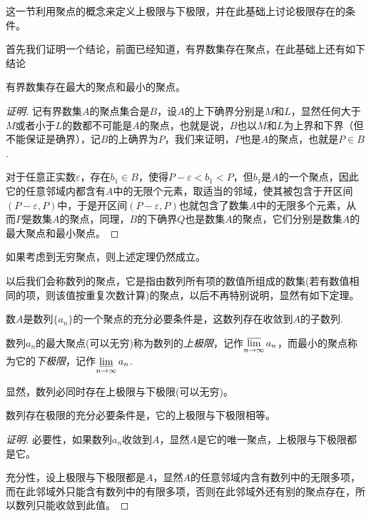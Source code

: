 这一节利用聚点的概念来定义上极限与下极限，并在此基础上讨论极限存在的条件。

首先我们证明一个结论，前面已经知道，有界数集存在聚点，在此基础上还有如下结论
\begin{theorem}
  有界数集存在最大的聚点和最小的聚点。
\end{theorem}

\begin{proof}[证明]
  记有界数集$A$的聚点集合是$B$，设$A$的上下确界分别是$M$和$L$，显然任何大于$M$或者小于$L$的数都不可能是$A$的聚点，也就是说，$B$也以$M$和$L$为上界和下界（但不能保证是确界），记$B$的上确界为$P$，我们来证明，$P$也是$A$的聚点，也就是$P \in B$.

  对于任意正实数$\varepsilon$，存在$b_1 \in B$，使得$P-\varepsilon < b_1 < P$，但$b_1$是$A$的一个聚点，因此它的任意邻域内都含有$A$中的无限个元素，取适当的邻域，使其被包含于开区间$(P-\varepsilon,P)$中，于是开区间$(P-\varepsilon,P)$也就包含了数集$A$中的无限多个元素，从而$P$是数集$A$的聚点，同理，$B$的下确界$Q$也是数集$A$的聚点，它们分别是数集$A$的最大聚点和最小聚点。
\end{proof}

如果考虑到无穷聚点，则上述定理仍然成立。

以后我们会称数列的聚点，它是指由数列所有项的数值所组成的数集(若有数值相同的项，则该值按重复次数计算)的聚点，以后不再特别说明，显然有如下定理。

\begin{theorem}
  数$A$是数列$\{a_n\}$的一个聚点的充分必要条件是，这数列存在收敛到$A$的子数列.
\end{theorem}

\begin{definition}
  数列$a_n$的最大聚点(可以无穷)称为数列的\emph{上极限}，记作$\varlimsup\limits_{n \to \infty}a_n$，而最小的聚点称为它的\emph{下极限}，记作$\varliminf\limits_{n \to \infty} a_n$.
\end{definition}

显然，数列必同时存在上极限与下极限(可以无穷)。

\begin{theorem}
数列存在极限的充分必要条件是，它的上极限与下极限相等。  
\end{theorem}

\begin{proof}[证明]
  必要性，如果数列$a_n$收敛到$A$，显然$A$是它的唯一聚点，上极限与下极限都是它。

  充分性，设上极限与下极限都是$A$，显然$A$的任意邻域内含有数列中的无限多项，而在此邻域外只能含有数列中的有限多项，否则在此邻域外还有别的聚点存在，所以数列只能收敛到此值。
\end{proof}



